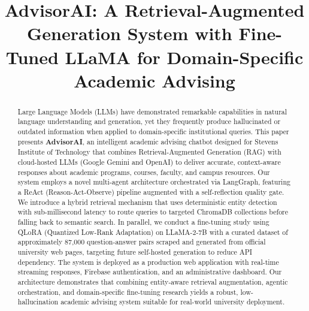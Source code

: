 \documentclass[conference,compsoc]{IEEEtran}
\begin{document}
\title{AdvisorAI: A Retrieval-Augmented Generation System with Fine-Tuned LLaMA for Domain-Specific Academic Advising}

\author{
}

\maketitle

\begin{abstract}
Large Language Models (LLMs) have demonstrated remarkable capabilities in natural language understanding and generation, yet they frequently produce hallucinated or outdated information when applied to domain-specific institutional queries. This paper presents \textbf{AdvisorAI}, an intelligent academic advising chatbot designed for Stevens Institute of Technology that combines Retrieval-Augmented Generation (RAG) with cloud-hosted LLMs (Google Gemini and OpenAI) to deliver accurate, context-aware responses about academic programs, courses, faculty, and campus resources. Our system employs a novel multi-agent architecture orchestrated via LangGraph, featuring a ReAct (Reason-Act-Observe) pipeline augmented with a self-reflection quality gate. We introduce a hybrid retrieval mechanism that uses deterministic entity detection with sub-millisecond latency to route queries to targeted ChromaDB collections before falling back to semantic search. In parallel, we conduct a fine-tuning study using QLoRA (Quantized Low-Rank Adaptation) on LLaMA-2-7B with a curated dataset of approximately 87,000 question-answer pairs scraped and generated from official university web pages, targeting future self-hosted generation to reduce API dependency. The system is deployed as a production web application with real-time streaming responses, Firebase authentication, and an administrative dashboard. Our architecture demonstrates that combining entity-aware retrieval augmentation, agentic orchestration, and domain-specific fine-tuning research yields a robust, low-hallucination academic advising system suitable for real-world university deployment.
\end{abstract}
\end{document}
